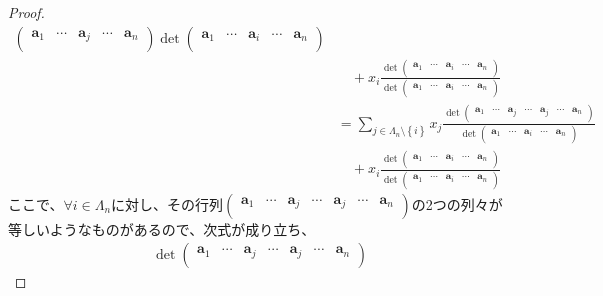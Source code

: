 \documentclass[dvipdfmx]{jsarticle}
\begin{document}
\begin{proof}
\begin{align*}
{{\begin{pmatrix}
\mathbf{a}_{1} & \cdots & \mathbf{a}_{j} & \cdots & \mathbf{a}_{n} \\
\end{pmatrix}}{\det\begin{pmatrix}
\mathbf{a}_{1} & \cdots & \mathbf{a}_{i} & \cdots & \mathbf{a}_{n} \\
\end{pmatrix}}} \\
&\quad + x_{i}\frac{\det\begin{pmatrix}
\mathbf{a}_{1} & \cdots & \mathbf{a}_{i} & \cdots & \mathbf{a}_{n} \\
\end{pmatrix}}{\det\begin{pmatrix}
\mathbf{a}_{1} & \cdots & \mathbf{a}_{i} & \cdots & \mathbf{a}_{n} \\
\end{pmatrix}}\\
&= \sum_{j \in \varLambda_{n} \setminus \left\{ i \right\}} {x_{j}\frac{\det\begin{pmatrix}
\mathbf{a}_{1} & \cdots & \mathbf{a}_{j} & \cdots & \mathbf{a}_{j} & \cdots & \mathbf{a}_{n} \\
\end{pmatrix}}{\det\begin{pmatrix}
\mathbf{a}_{1} & \cdots & \mathbf{a}_{i} & \cdots & \mathbf{a}_{n} \\
\end{pmatrix}}} \\
&\quad + x_{i}\frac{\det\begin{pmatrix}
\mathbf{a}_{1} & \cdots & \mathbf{a}_{i} & \cdots & \mathbf{a}_{n} \\
\end{pmatrix}}{\det\begin{pmatrix}
\mathbf{a}_{1} & \cdots & \mathbf{a}_{i} & \cdots & \mathbf{a}_{n} \\
\end{pmatrix}}
\end{align*}
ここで、$\forall i \in \varLambda_{n}$に対し、その行列$\begin{pmatrix}
\mathbf{a}_{1} & \cdots & \mathbf{a}_{j} & \cdots & \mathbf{a}_{j} & \cdots & \mathbf{a}_{n} \\
\end{pmatrix}$の2つの列々が等しいようなものがあるので、次式が成り立ち、
\begin{align*}
\det\begin{pmatrix}
\mathbf{a}_{1} & \cdots & \mathbf{a}_{j} & \cdots & \mathbf{a}_{j} & \cdots & \mathbf{a}_{n} \\

\end{pmatrix}
\end{align*}
\end{proof}
\end{document}
